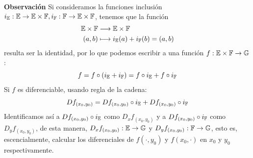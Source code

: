 \documentclass[12pt,a4paper]{book}
\begin{document}
\textbf{ Observación} Si consideramos la funciones inclusión  $i_{\mathbb{E}}: \mathbb{E} \rightarrow \mathbb{E} \times \mathbb{F},i_{\mathbb{F}}:\mathbb{F} \rightarrow \mathbb{E} \times \mathbb{F}$, tenemos que la función 
\begin{align*}
\mathbb{E} \times \mathbb{F} &\longrightarrow \mathbb{E} \times \mathbb{F}\\
(a,b) &\longmapsto i_{\mathbb{E}}(a)+i_{\mathbb{F}}(b) = (a,b)
\end{align*}
resulta ser la identidad, por lo que podemos escribir a una función $f: \mathbb{E} \times \mathbb{F} \rightarrow \mathbb{G}$:
$$f = f \circ (i_{\mathbb{E}} +  i_{\mathbb{F}}) = f \circ i_{\mathbb{E}} + f \circ i_{\mathbb{F}}$$
Si $f$ es diferenciable, usando regla de la cadena:
$$Df_{(x_0,y_0)} = Df_{(x_0,y_0)} \circ i_{\mathbb{E}} + Df_{(x_0,y_0)} \circ i_{\mathbb{F}}$$
Identificamos así a $Df_{(x_0,y_0)} \circ i_{\mathbb{E}}$ como $D_xf_{(x_0,y_0)}$ y a $Df_{(x_0,y_0)} \circ i_{\mathbb{F}}$ como $D_yf_{(x_0,y_0)}$, de esta manera, $D_xf_{(x_0,y_0)}: \mathbb{E} \rightarrow \mathbb{G}$ y $D_yf_{(x_0,y_0)}:\mathbb{F} \rightarrow \mathbb{G}$, esto es, escencialmente, calcular los diferenciales de $f(\cdot, y_0)$ y $f(x_0, \cdot)$ en $x_0$ y $y_0$ respectivamente.
\end{document}
